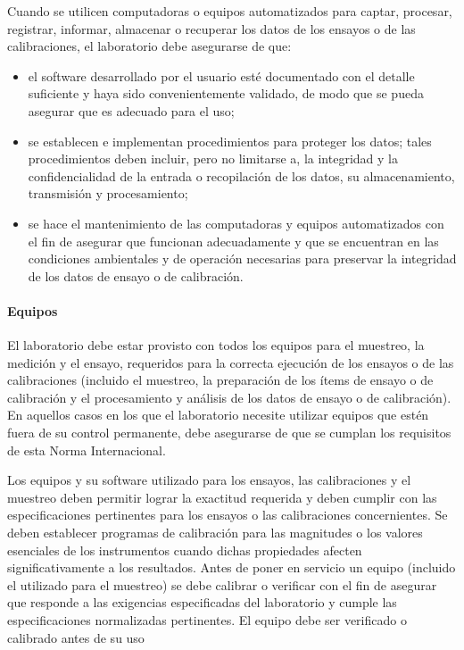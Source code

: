 				\par \noindent
					Cuando se utilicen computadoras o equipos automatizados para captar, procesar, registrar,
					informar, almacenar o recuperar los datos de los ensayos o de las calibraciones, el laboratorio debe
					asegurarse de que:
					
				\begin{itemize}
					\item el software desarrollado por el usuario esté documentado con el detalle suficiente y haya sido
					convenientemente validado, de modo que se pueda asegurar que es adecuado para el uso;
					
					\item se establecen e implementan procedimientos para proteger los datos; tales procedimientos deben incluir,
					pero no limitarse a, la integridad y la confidencialidad de la entrada o recopilación de los datos, su
					almacenamiento, transmisión y procesamiento;
					
					\item se hace el mantenimiento de las computadoras y equipos automatizados con el fin de asegurar que
					funcionan adecuadamente y que se encuentran en las condiciones ambientales y de operación
					necesarias para preservar la integridad de los datos de ensayo o de calibración.
				\end{itemize}
			
\newpage
\thispagestyle{plain}
			
		\paragraph{Equipos}
			\par 
				El laboratorio debe estar provisto con todos los equipos para el muestreo, la medición y el ensayo,
				requeridos para la correcta ejecución de los ensayos o de las calibraciones (incluido el muestreo, la
				preparación de los ítems de ensayo o de calibración y el procesamiento y análisis de los datos de ensayo o
				de calibración). En aquellos casos en los que el laboratorio necesite utilizar equipos que estén fuera de su
				control permanente, debe asegurarse de que se cumplan los requisitos de esta Norma Internacional.
				
			\par \noindent
				Los equipos y su software utilizado para los ensayos, las calibraciones y el muestreo deben permitir
				lograr la exactitud requerida y deben cumplir con las especificaciones pertinentes para los ensayos o las
				calibraciones concernientes. Se deben establecer programas de calibración para las magnitudes o los valores
				esenciales de los instrumentos cuando dichas propiedades afecten significativamente a los resultados. Antes
				de poner en servicio un equipo (incluido el utilizado para el muestreo) se debe calibrar o verificar con el fin de
				asegurar que responde a las exigencias especificadas del laboratorio y cumple las especificaciones
				normalizadas pertinentes. El equipo debe ser verificado o calibrado antes de su uso 
				
